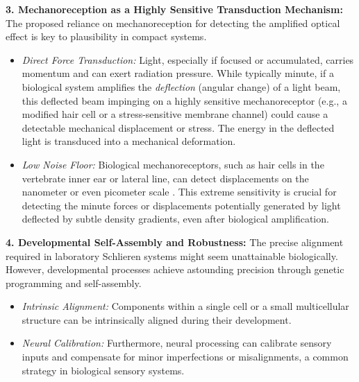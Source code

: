 \documentclass[11pt]{article}
\begin{document}
\textbf{3. Mechanoreception as a Highly Sensitive Transduction Mechanism:}
The proposed reliance on mechanoreception for detecting the amplified optical effect is key to plausibility in compact systems.
    \begin{itemize}
        \item \textit{Direct Force Transduction:} Light, especially if focused or accumulated, carries momentum and can exert radiation pressure. While typically minute, if a biological system amplifies the \textit{deflection} (angular change) of a light beam, this deflected beam impinging on a highly sensitive mechanoreceptor (e.g., a modified hair cell or a stress-sensitive membrane channel) could cause a detectable mechanical displacement or stress. The energy in the deflected light is transduced into a mechanical deformation.
        \item \textit{Low Noise Floor:} Biological mechanoreceptors, such as hair cells in the vertebrate inner ear or lateral line, can detect displacements on the nanometer or even picometer scale \cite{Hudspeth1989EarWorks, Dijkgraaf1963LateralLine}. This extreme sensitivity is crucial for detecting the minute forces or displacements potentially generated by light deflected by subtle density gradients, even after biological amplification.
    \end{itemize}

\textbf{4. Developmental Self-Assembly and Robustness:}
The precise alignment required in laboratory Schlieren systems might seem unattainable biologically. However, developmental processes achieve astounding precision through genetic programming and self-assembly.
    \begin{itemize}
        \item \textit{Intrinsic Alignment:} Components within a single cell or a small multicellular structure can be intrinsically aligned during their development.
        \item \textit{Neural Calibration:} Furthermore, neural processing can calibrate sensory inputs and compensate for minor imperfections or misalignments, a common strategy in biological sensory systems.
    \end{itemize}
\end{document}
